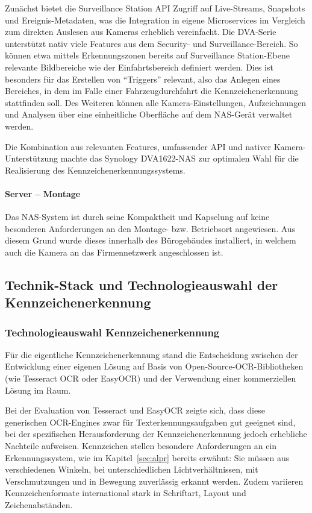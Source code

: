 Zunächst bietet die Surveillance Station API Zugriff auf Live-Streams, Snapshots und Ereignis-Metadaten, was die Integration in eigene Microservices im Vergleich zum direkten Auslesen aus Kameras erheblich vereinfacht.
Die DVA-Serie unterstützt nativ viele Features aus dem Security- und Surveillance-Bereich.
So können etwa mittels Erkennungszonen bereits auf Surveillance Station-Ebene relevante Bildbereiche wie der Einfahrtsbereich definiert werden. \cite{synology_dva}
Dies ist besonders für das Erstellen von "`Triggers"' relevant, also das Anlegen eines Bereiches, in dem im Falle einer Fahrzeugdurchfahrt die Kennzeichenerkennung stattfinden soll.
Des Weiteren können alle Kamera-Einstellungen, Aufzeichnungen und Analysen über eine einheitliche Oberfläche auf dem NAS-Gerät verwaltet werden. \cite{synology_surveillance}

Die Kombination aus relevanten Features, umfassender API und nativer Kamera-Unterstützung machte das Synology DVA1622-NAS zur optimalen Wahl für die Realisierung des Kennzeichenerkennungssystems.


\paragraph{Server -- Montage}

Das NAS-System ist durch seine Kompaktheit und Kapselung auf keine besonderen Anforderungen an den Montage- bzw. Betriebsort angewiesen.
Aus diesem Grund wurde dieses innerhalb des Bürogebäudes installiert, in welchem auch die Kamera an das Firmennetzwerk angeschlossen ist.

\newpage
\subsection{Technik-Stack und Technologieauswahl der Kennzeichenerkennung}
\label{sec:techstack}

\subsubsection{Technologieauswahl Kennzeichenerkennung}

Für die eigentliche Kennzeichenerkennung stand die Entscheidung zwischen der Entwicklung einer eigenen Lösung auf Basis von Open-Source-OCR-Bibliotheken (wie Tesseract OCR oder EasyOCR) und der Verwendung einer kommerziellen Lösung im Raum.

Bei der Evaluation von Tesseract und EasyOCR zeigte sich, dass diese generischen OCR-Engines zwar für Texterkennungsaufgaben gut geeignet sind, bei der spezifischen Herausforderung der Kennzeichenerkennung jedoch erhebliche Nachteile aufweisen.
Kennzeichen stellen besondere Anforderungen an ein Erkennungssystem, wie im Kapitel~\ref{sec:alpr} bereits erwähnt:
Sie müssen aus verschiedenen Winkeln, bei unterschiedlichen Lichtverhältnissen, mit Verschmutzungen und in Bewegung zuverlässig erkannt werden.
Zudem variieren Kennzeichenformate international stark in Schriftart, Layout und Zeichenabständen.

